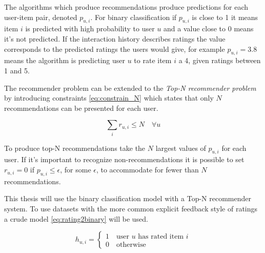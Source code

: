 
The algorithms which produce recommendations produce predictions for each user-item pair, denoted $p_{u, i}$.  For binary classification if $p_{u, i}$ is close to 1 it means item $i$ is predicted with high probability to user $u$ and a value close to 0 means it's not predicted. If the interaction history describes ratings the value corresponds to the predicted ratings the users would give, for example $p_{u, i} = 3.8$ means the algorithm is predicting user $u$ to rate item $i$ a 4, given ratings between 1 and 5.

The recommender problem can be extended to the \textit{Top-N recommender problem} by introducing constraints \eqref{eq:constrain_N} which states that only $N$ recommendations can be presented for each user.

\begin{equation}\label{eq:constrain_N}
    \sum_i r_{u, i} \leq N \quad \forall u
\end{equation}

To produce top-N recommendations take the $N$ largest values of $p_{u, i}$ for each user. If it's important to recognize non-recommendations it is possible to set $r_{u, i} = 0$ if $p_{u, i} \leq \epsilon$, for some $\epsilon$, to accommodate for fewer than $N$ recommendations.

This thesis will use the binary classification model with a Top-N recommender system. To use datasets with the more common explicit feedback style of ratings a crude model \eqref{eq:rating2binary} will be used.

\begin{equation} \label{eq:rating2binary}
    h_{u, i} = \begin{cases}
        1 \quad \text{user $u$ has rated item $i$} \\
        0 \quad \text{otherwise}
    \end{cases}
\end{equation}


